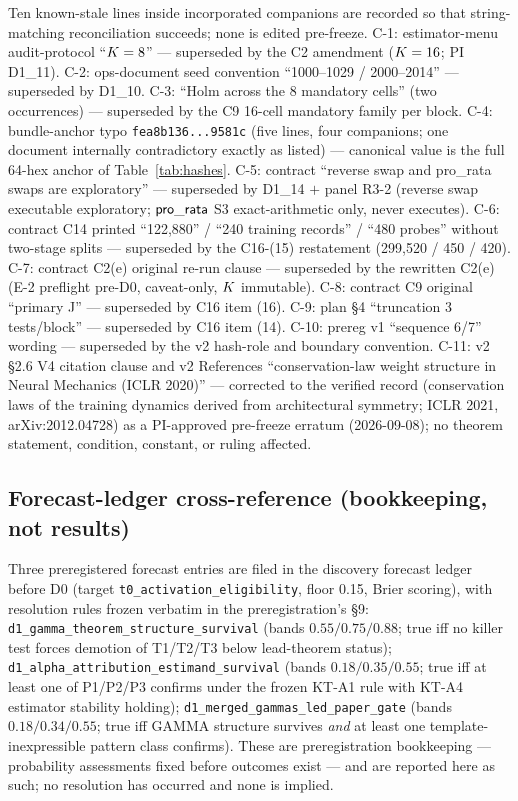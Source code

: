 Ten known-stale lines inside incorporated companions are recorded so that
string-matching reconciliation succeeds; none is edited pre-freeze. C-1:
estimator-menu audit-protocol ``$K = 8$'' --- superseded by the C2
amendment ($K = 16$; PI D1\_11). C-2: ops-document seed convention
``1000--1029 / 2000--2014'' --- superseded by D1\_10. C-3: ``Holm across the
8 mandatory cells'' (two occurrences) --- superseded by the C9 16-cell
mandatory family per block. C-4: bundle-anchor typo
\texttt{fea8b136...9581c} (five lines, four companions; one document
internally contradictory exactly as listed) --- canonical value is the full
64-hex anchor of Table~\ref{tab:hashes}. C-5: contract ``reverse swap and
pro\_rata swaps are
exploratory'' --- superseded by D1\_14 $+$ panel R3-2 (reverse swap
executable exploratory; $\mathsf{pro\_rata}$ S3 exact-arithmetic only, never
executes). C-6: contract C14 printed ``122,880'' / ``240 training records''
/ ``480 probes'' without two-stage splits --- superseded by the C16-(15)
restatement (299{,}520 / 450 / 420). C-7: contract C2(e) original re-run
clause --- superseded by the rewritten C2(e) (E-2 preflight pre-D0,
caveat-only, $K$ immutable). C-8: contract C9 original ``primary J''
--- superseded by C16 item (16). C-9: plan \S4 ``truncation 3 tests/block''
--- superseded by C16 item (14). C-10: prereg v1 ``sequence 6/7'' wording
--- superseded by the v2 hash-role and boundary convention. C-11: v2 \S2.6
V4 citation clause and v2 References ``conservation-law weight structure in
Neural Mechanics (ICLR 2020)'' --- corrected to the verified record
(conservation laws of the training dynamics derived from architectural
symmetry; ICLR 2021, arXiv:2012.04728) as a PI-approved pre-freeze erratum
(2026-09-08); no theorem statement, condition, constant, or ruling affected.

\subsection{Forecast-ledger cross-reference (bookkeeping, not results)}
\label{app:prereg-ledger}

Three preregistered forecast entries are filed in the discovery forecast
ledger before D0 (target \texttt{t0\_activation\_eligibility}, floor 0.15,
Brier scoring), with resolution rules frozen verbatim in the
preregistration's \S9: \texttt{d1\_gamma\_theorem\_structure\_survival}
(bands $0.55/0.75/0.88$; true iff no killer test forces demotion of
T1/T2/T3 below lead-theorem status);
\texttt{d1\_alpha\_attribution\_estimand\_survival} (bands
$0.18/0.35/0.55$; true iff at least one of P1/P2/P3 confirms under the
frozen KT-A1 rule with KT-A4 estimator stability holding);
\texttt{d1\_merged\_gammas\_led\_paper\_gate} (bands $0.18/0.34/0.55$; true
iff GAMMA structure survives \emph{and} at least one
template-inexpressible pattern class confirms). These are preregistration
bookkeeping --- probability assessments fixed before outcomes exist --- and
are reported here as such; no resolution has occurred and none is implied.

